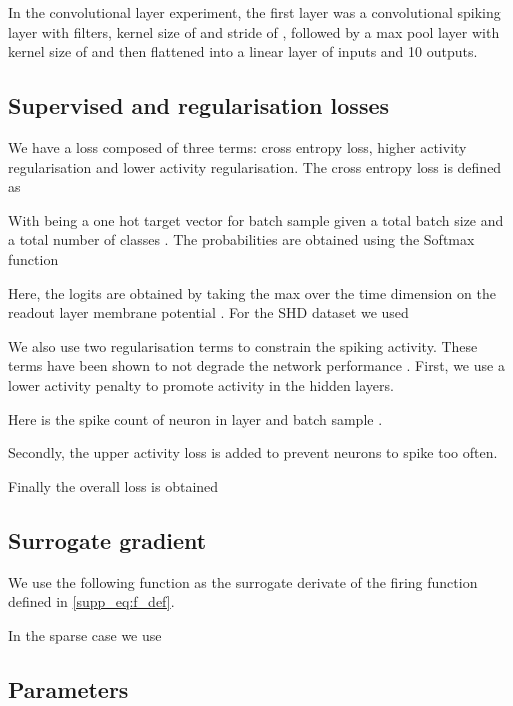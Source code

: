\documentclass{article}
\begin{document}
In the convolutional layer experiment, the first layer was a convolutional spiking layer with  filters, kernel size of  and stride of , followed by a max pool layer with kernel size of  and then flattened into a linear layer of  inputs and 10 outputs.


\subsection{Supervised and regularisation losses}

We have a loss composed of three terms: cross entropy loss, higher activity regularisation and lower activity regularisation. The cross entropy loss is defined as 



With  being a one hot target vector for batch sample  given a total batch size  and a total number of classes . The probabilities  are obtained using the Softmax function



Here, the logits  are obtained by taking the max over the time dimension on the readout layer membrane potential . For the SHD dataset we used 

We also use two regularisation terms to constrain the spiking activity. These terms have been shown to not degrade the network performance \cite{zenke2021remarkable}. First, we use a lower activity penalty to promote activity in the hidden layers.



Here  is the spike count of neuron  in layer  and batch sample . 

Secondly, the upper activity loss is added to prevent neurons to spike too often. 



 Finally the overall loss is obtained 



\subsection{Surrogate gradient}

We use the following function as the surrogate derivate of the firing function defined in \eqref{supp_eq:f_def}.



In the sparse case we use 



\newpage
\subsection{Parameters}
\end{document}
